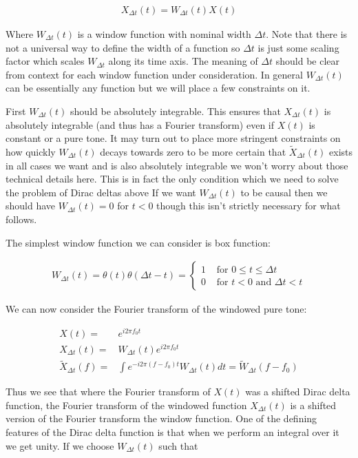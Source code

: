 \documentclass[12pt]{article}
\begin{document}
\begin{align}
X_{\Delta t}(t) = W_{\Delta t}(t) X(t)
\end{align}

Where $W_{\Delta t}(t)$ is a window function with nominal width $\Delta t$.
Note that there is not a universal way to define the width of a function so $\Delta t$ is just some scaling factor which scales $W_{\Delta t}$ along its time axis.
The meaning of $\Delta t$ should be clear from context for each window function under consideration. 
In general $W_{\Delta t}(t)$ can be essentially any function but we will place a few constraints on it.

First $W_{\Delta t}(t)$ should be absolutely integrable. 
This ensures that $X_{\Delta t}(t)$ is absolutely integrable (and thus has a Fourier transform) even if $X(t)$ is constant or a pure tone.
It may turn out to place more stringent constraints on how quickly $W_{\Delta t}(t)$ decays towards zero to be more certain that $\tilde{X}_{\Delta t}(t)$ exists in all cases we want and is also absolutely integrable we won't worry about those technical details here.
This is in fact the only condition which we need to solve the problem of Dirac deltas above
If we want $W_{\Delta t}(t)$ to be causal then we should have $W_{\Delta t}(t) = 0$ for $t < 0$ though this isn't strictly necessary for what follows.

The simplest window function we can consider is box function:

\begin{align}
W_{\Delta t}(t) = \theta(t)\theta(\Delta t - t) = 
\begin{cases}
1 & \text{ for } 0 \le t \le \Delta t\\
0 & \text{ for } t < 0 \text{ and } \Delta t < t
\end{cases}
\end{align}

We can now consider the Fourier transform of the windowed pure tone:

\begin{align}
X(t) =& e^{i2\pi f_0 t}\\
X_{\Delta t}(t) =& W_{\Delta t}(t) e^{i2\pi f_0t}\\
\tilde{X}_{\Delta t}(f) =& \int e^{-i2\pi (f - f_0)t} W_{\Delta t}(t) dt = \tilde{W}_{\Delta t}(f-f_0)
\end{align}

Thus we see that where the Fourier transform of $X(t)$ was a shifted Dirac delta function, the Fourier transform of the windowed function $X_{\Delta t}(t)$ is a shifted version of the Fourier transform the window function.
One of the defining features of the Dirac delta function is that when we perform an integral over it we get unity. If we choose $W_{\Delta t}(t)$ such that
\end{document}
